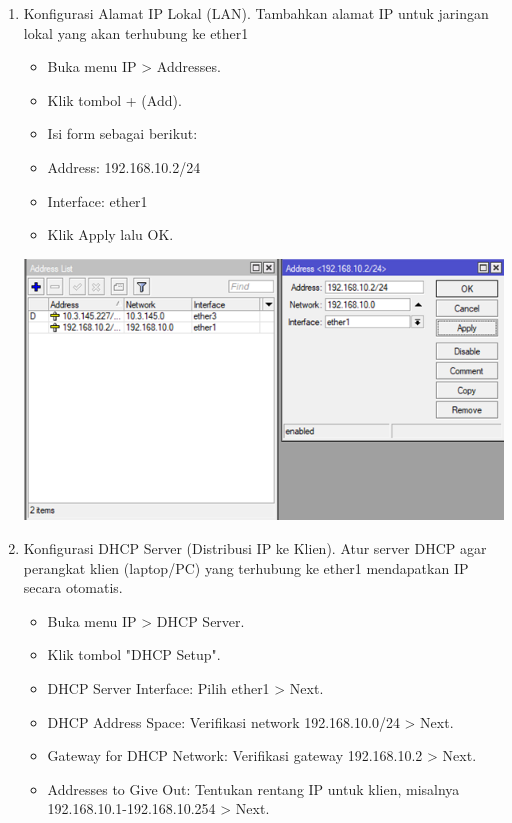 \begin{enumerate}
\begin{enumerate}
\begin{center}
        \end{center}
        \item Konfigurasi Alamat IP Lokal (LAN). Tambahkan alamat IP untuk jaringan lokal yang akan terhubung ke ether1
        \begin{itemize}
            \item Buka menu IP > Addresses.
            \item Klik tombol + (Add).
            \item Isi form sebagai berikut:
            \item Address: 192.168.10.2/24
            \item Interface: ether1
            \item Klik Apply lalu OK.
        \end{itemize}
        \begin{center}
            \includegraphics[scale=0.7]{P1/img/5 Konfigurasi Alamat IP Lokal (LAN).png}        
        \end{center}
        \item Konfigurasi DHCP Server (Distribusi IP ke Klien). Atur server DHCP agar perangkat klien (laptop/PC) yang terhubung ke ether1 mendapatkan IP secara otomatis.
        \begin{itemize}
            \item Buka menu IP > DHCP Server.
            \item Klik tombol "DHCP Setup".
            \item DHCP Server Interface: Pilih ether1 > Next.
            \item DHCP Address Space: Verifikasi network 192.168.10.0/24 > Next.
            \item Gateway for DHCP Network: Verifikasi gateway 192.168.10.2 > Next.
            \item Addresses to Give Out: Tentukan rentang IP untuk klien, misalnya 192.168.10.1-192.168.10.254 > Next.

\end{itemize}
\end{enumerate}
\end{enumerate}
